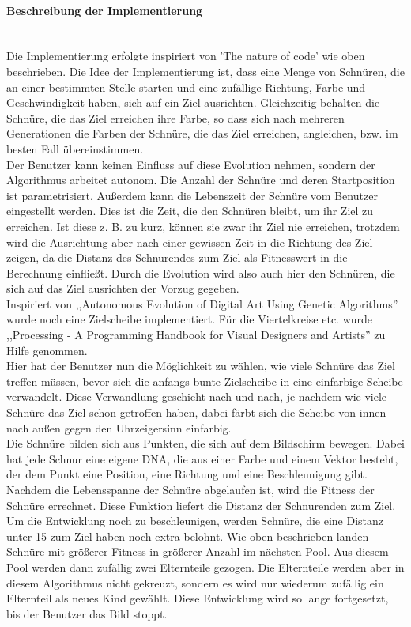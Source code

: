 \documentclass[../mciAusarbeitung.tex]{subfiles}
\begin{document}
		\paragraph{Beschreibung der Implementierung}$~$\\
		Die Implementierung erfolgte inspiriert von 'The nature of code' \cite{shiffman2012nature} wie oben beschrieben.
		Die Idee der Implementierung ist, dass eine Menge von Schnüren, die an einer bestimmten Stelle starten und eine zufällige Richtung, Farbe und Geschwindigkeit haben, sich auf ein Ziel ausrichten. Gleichzeitig behalten die Schnüre, die das Ziel erreichen ihre Farbe, so dass sich nach mehreren Generationen die Farben der Schnüre, die das Ziel erreichen, angleichen, bzw. im besten Fall übereinstimmen.\\
		Der Benutzer kann keinen Einfluss auf diese Evolution nehmen, sondern der Algorithmus arbeitet autonom. Die Anzahl der Schnüre und deren Startposition ist parametrisiert. Außerdem kann die Lebenszeit der Schnüre vom Benutzer eingestellt werden. Dies ist die Zeit, die den Schnüren bleibt, um ihr Ziel zu erreichen. Ist diese z. B. zu kurz, können sie zwar ihr Ziel nie erreichen, trotzdem wird die Ausrichtung aber nach einer gewissen Zeit in die Richtung des Ziel zeigen, da die Distanz des Schnurendes zum Ziel als Fitnesswert in die Berechnung einfließt. Durch die Evolution wird also auch hier den Schnüren, die sich auf das Ziel ausrichten der Vorzug gegeben.\\
		Inspiriert von ,,Autonomous Evolution of Digital Art Using Genetic Algorithms'' \cite{house2016autonomous} wurde noch eine Zielscheibe implementiert. Für die Viertelkreise etc. wurde ,,Processing - A Programming Handbook for Visual Designers and Artists'' \cite{reas2007processing} zu Hilfe genommen.\\ Hier hat der Benutzer nun die Möglichkeit zu wählen, wie viele Schnüre das Ziel treffen müssen, bevor sich die anfangs bunte Zielscheibe in eine einfarbige Scheibe verwandelt. Diese Verwandlung geschieht nach und nach, je nachdem wie viele Schnüre das Ziel schon getroffen haben, dabei färbt sich die Scheibe von innen nach außen gegen den Uhrzeigersinn einfarbig.\\
		Die Schnüre bilden sich aus Punkten, die sich auf dem Bildschirm bewegen. Dabei hat jede Schnur eine eigene DNA, die aus einer Farbe und einem  Vektor besteht, der dem Punkt eine Position, eine Richtung und eine Beschleunigung gibt.  Nachdem die Lebensspanne der Schnüre abgelaufen ist, wird die Fitness der Schnüre errechnet. Diese Funktion liefert die Distanz der Schnurenden zum Ziel. Um die Entwicklung noch zu beschleunigen, werden Schnüre, die eine Distanz unter 15 zum Ziel haben noch extra belohnt. Wie oben beschrieben landen Schnüre mit größerer Fitness in größerer Anzahl im nächsten Pool. Aus diesem Pool werden dann zufällig zwei Elternteile gezogen. Die Elternteile werden aber in diesem Algorithmus nicht gekreuzt, sondern es wird nur wiederum zufällig ein Elternteil als neues Kind gewählt. Diese Entwicklung wird so lange fortgesetzt, bis der Benutzer das Bild stoppt.\\
\end{document}
